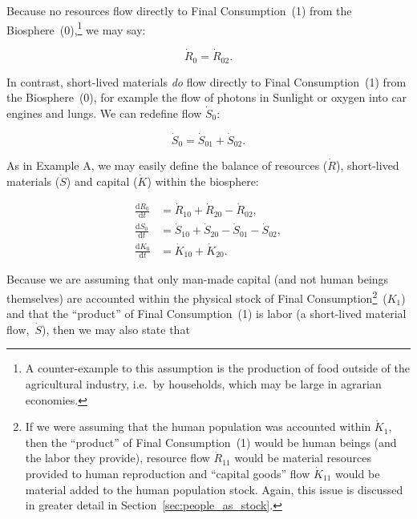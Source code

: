 Because no resources flow directly to Final Consumption~(1)
from the Biosphere~(0),\footnote{A 
	counter-example to this assumption is 
	the production of food
	outside of the agricultural industry, 
	i.e.\ by households, 
	which may be large in agrarian economies.
	}
 we may say:

\begin{equation}\label{eq:B_R0}
	\dot{R}_{0} = \dot{R}_{02}.
\end{equation}

In contrast, 
short-lived materials \emph{do} flow directly to Final Consumption~(1) 
from the Biosphere~(0), 
for example the flow of photons in Sunlight or 
oxygen into car engines and lungs. 
We can redefine flow $\dot{S}_{0}$:

\begin{equation}\label{eq:B_S0}
	\dot{S}_{0} 
	= \dot{S}_{01} + \dot{S}_{02}.
\end{equation}

As in Example A, we may easily define 
the balance of resources ($\dot{R}$),
short-lived materials ($\dot{S}$) and
capital ($\dot{K}$) within the biosphere:

\begin{align}\label{eq:B_dR0}
	\frac{\mathrm{d}R_{0}}{\mathrm{d}t}	&
	= \dot{R}_{10}
	+ \dot{R}_{20}
	- \dot{R}_{02},										\\
\label{eq:B_dS0}
	\frac{\mathrm{d}S_{0}}{\mathrm{d}t}	&
	= \dot{S}_{10}
	+ \dot{S}_{20}
	- \dot{S}_{01}
	- \dot{S}_{02},										\\	
\label{eq:B_dK0}
	\frac{\mathrm{d}K_{0}}{\mathrm{d}t}	&
	= \dot{K}_{10}
	+ \dot{K}_{20}.
\end{align}

Because we are assuming that only man-made capital
(and not human beings themselves)
are accounted within the physical stock of 
Final Consumption\footnote{If
	we were assuming that the human population
	was accounted within $\dot{K}_{1}$,
	then the ``product'' of Final Consumption~(1) would be human beings
	(and the labor they provide),
	resource flow $\dot{R}_{11}$ would be material resources
	provided to human reproduction and
	``capital goods'' flow $\dot{K}_{11}$ would be material
	added to the human population stock. Again, 
	this issue is discussed in greater detail in 
	Section~\ref{sec:people_as_stock}.
}~($K_{1}$)
and that the ``product'' of Final Consumption~(1) is labor
(a short-lived material flow,~$\dot{S}$),
then we may also state that

